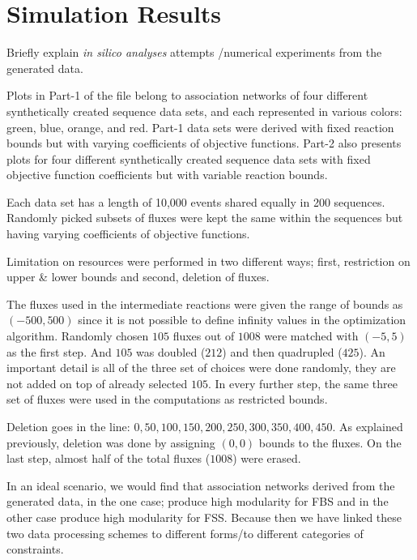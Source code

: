 \section{Simulation Results}
{\color{red} 
	
	Briefly explain \emph{in silico analyses} attempts /numerical experiments from the generated data.
	
	Plots in Part-1 of the file belong to association networks of four different synthetically created sequence data sets, and each represented in various colors: green, blue, orange, and red. Part-1 data sets were derived with fixed reaction bounds but with varying coefficients of objective functions. Part-2 also presents plots for four different synthetically created sequence data sets with fixed objective function coefficients but with variable reaction bounds.
	
	Each data set has a length of 10,000 events shared equally in 200 sequences. Randomly picked subsets of fluxes were kept the same within the sequences but having varying coefficients of objective functions.
	
	
	
	Limitation on resources were performed in two different ways; first, restriction on upper \& lower bounds and second, deletion of fluxes.
	
	The fluxes used in the intermediate reactions were given the range of bounds as $(-500, 500)$ since it is not possible to define infinity values in the optimization algorithm. Randomly chosen $105$ fluxes out of $1008$ were matched with $(-5, 5)$ as the first step. And $105$ was doubled ($212$) and then quadrupled ($425$). An important detail is all of the three set of choices were done randomly, they are not added on top of already selected $105$. In every further step, the same three set of fluxes were used in the computations as restricted bounds.
	
	Deletion goes in the line: $0, 50, 100, 150, 200, 250, 300, 350, 400, 450$. As explained previously, deletion was done by assigning $(0, 0)$ bounds to the fluxes. On the last step, almost half of the total fluxes ($1008$) were erased.
	
	In an ideal scenario, we would find that association networks derived from the generated data, in the one case; produce high modularity for FBS and in the other case produce high modularity for FSS. Because then we have linked these two data processing schemes to different forms/to different categories of constraints.
	
}
